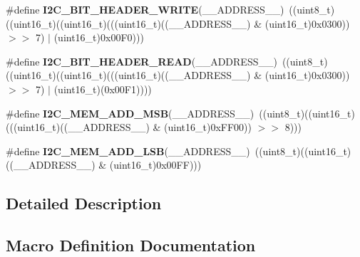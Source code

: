 \begin{DoxyCompactItemize}
\item 
\mbox{\label{group___i2_c___private___macros_ga0edd591eaa2ce5511148bf1ebf533e1a}} 
\#define {\bfseries I2\+C\+\_\+B\+I\+T\+\_\+\+H\+E\+A\+D\+E\+R\+\_\+\+W\+R\+I\+TE}(\+\_\+\+\_\+\+A\+D\+D\+R\+E\+S\+S\+\_\+\+\_\+)~((uint8\+\_\+t)((uint16\+\_\+t)((uint16\+\_\+t)(((uint16\+\_\+t)((\+\_\+\+\_\+\+A\+D\+D\+R\+E\+S\+S\+\_\+\+\_\+) \& (uint16\+\_\+t)0x0300)) $>$$>$ 7) $\vert$ (uint16\+\_\+t)0x00\+F0)))
\item 
\mbox{\label{group___i2_c___private___macros_ga8d833802aafa40a959f62965e498108c}} 
\#define {\bfseries I2\+C\+\_\+B\+I\+T\+\_\+\+H\+E\+A\+D\+E\+R\+\_\+\+R\+E\+AD}(\+\_\+\+\_\+\+A\+D\+D\+R\+E\+S\+S\+\_\+\+\_\+)~((uint8\+\_\+t)((uint16\+\_\+t)((uint16\+\_\+t)(((uint16\+\_\+t)((\+\_\+\+\_\+\+A\+D\+D\+R\+E\+S\+S\+\_\+\+\_\+) \& (uint16\+\_\+t)0x0300)) $>$$>$ 7) $\vert$ (uint16\+\_\+t)(0x00\+F1))))
\item 
\mbox{\label{group___i2_c___private___macros_ga2e42fa55be22240dc5a54a0304d01cfb}} 
\#define {\bfseries I2\+C\+\_\+\+M\+E\+M\+\_\+\+A\+D\+D\+\_\+\+M\+SB}(\+\_\+\+\_\+\+A\+D\+D\+R\+E\+S\+S\+\_\+\+\_\+)~((uint8\+\_\+t)((uint16\+\_\+t)(((uint16\+\_\+t)((\+\_\+\+\_\+\+A\+D\+D\+R\+E\+S\+S\+\_\+\+\_\+) \& (uint16\+\_\+t)0x\+F\+F00)) $>$$>$ 8)))
\item 
\mbox{\label{group___i2_c___private___macros_ga9c8f1a763307d0c37bb4e2dcfdf3bb9f}} 
\#define {\bfseries I2\+C\+\_\+\+M\+E\+M\+\_\+\+A\+D\+D\+\_\+\+L\+SB}(\+\_\+\+\_\+\+A\+D\+D\+R\+E\+S\+S\+\_\+\+\_\+)~((uint8\+\_\+t)((uint16\+\_\+t)((\+\_\+\+\_\+\+A\+D\+D\+R\+E\+S\+S\+\_\+\+\_\+) \& (uint16\+\_\+t)0x00\+F\+F)))
\end{DoxyCompactItemize}


\subsection{Detailed Description}


\subsection{Macro Definition Documentation}
\mbox{\label{group___i2_c___private___macros_ga0e871b470a0f7a9d641156f07e37c810}} 
